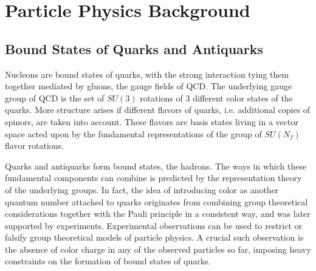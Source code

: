 \chapter{Particle Physics Background}

\section{Bound States of Quarks and Antiquarks}

Nucleons are bound states of quarks, with the strong interaction tying them together mediated by gluons, the gauge fields of QCD. The underlying gauge group of QCD is the set of $SU(3)$ rotations of 3 different color states of the quarks. More structure arises if different flavors of quarks, i.e. additional copies of spinors, are taken into account. These flavors are basis states living in a vector space acted upon by the fundamental representations of the group of $SU(N_f)$ flavor rotations. 

Quarks and antiquarks form bound states, the hadrons. The ways in which these fundamental components can combine is predicted by the representation theory of the underlying groups. In fact, the idea of introducing color as another quantum number attached to quarks originates from combining group theoretical considerations together with the Pauli principle in a consistent way, and was later supported by experiments. Experimental observations can be used to restrict or falsify group theoretical models of particle physics. A crucial such observation is the absence of color charge in any of the observed particles so far, imposing heavy constraints on the formation of bound states of quarks.

